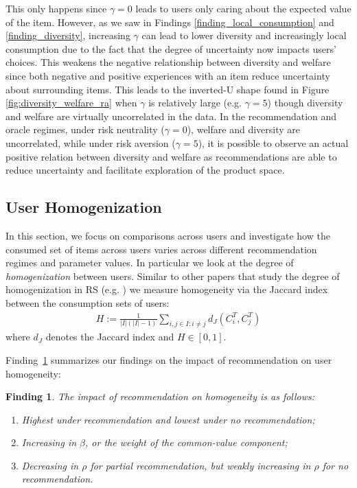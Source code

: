 \documentclass[sigconf]{acmart}
\newtheorem{finding}{Finding}
\begin{document}
This only happens since $\gamma = 0$ leads to users only caring about the expected value of the item. However, as we saw in Findings \ref{finding_local_consumption} and \ref{finding_diversity}, increasing $\gamma$ can lead to lower diversity and increasingly local consumption due to the fact that the degree of uncertainty now impacts users' choices. This weakens the negative relationship between diversity and welfare since both negative and positive experiences with an item reduce uncertainty about surrounding items. This leads to the inverted-U shape found in Figure \ref{fig:diversity_welfare_ra} when $\gamma$ is relatively large (e.g. $\gamma = 5$) though diversity and welfare are virtually uncorrelated in the data. In the recommendation and oracle regimes, under risk neutrality ($\gamma=0$), welfare and diversity are uncorrelated, while under risk aversion ($\gamma=5$), it is possible to observe an actual positive relation between diversity and welfare as recommendations are able to reduce uncertainty and facilitate exploration of the product space.

\subsection{User Homogenization}


In this section, we focus on comparisons across users and investigate how the consumed set of items across users varies across different recommendation regimes and parameter values. In particular we look at the degree of \textit{homogenization} between users. Similar to other papers that study the degree of homogenization in RS (e.g. \cite{chaney2018algorithmic}) we measure homogeneity via the Jaccard index between the consumption sets of users:
\begin{align*}
H:=\frac{1}{|I|(|I|-1)}\sum_{i,j \in I: i \ne j}d_J(C_i^T,C_j^T)
\end{align*}
where $d_J$ denotes the Jaccard index and $H \in [0,1]$.


\noindent Finding~\ref{finding_homogeneity} summarizes our findings on the impact of recommendation on user homogeneity:

\begin{finding}\label{finding_homogeneity}
The impact of recommendation on homogeneity is as follows:
\begin{enumerate}
\item Highest under recommendation and lowest under no recommendation;
\item Increasing in $\beta$, or the weight of the common-value component;
\item Decreasing in $\rho$ for partial recommendation, but weakly increasing in $\rho$ for no recommendation.
\end{enumerate}
\end{finding}
\end{document}
